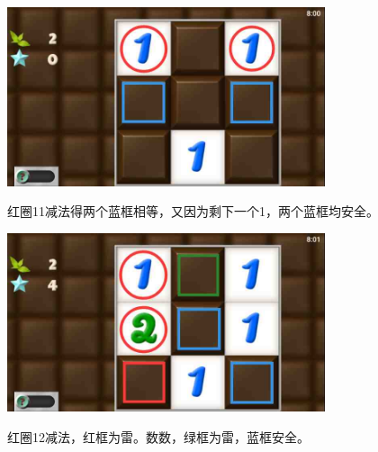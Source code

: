 \subsection{} %
\begin{center}
    \includegraphics[width=0.7\textwidth]{puzzlelow/12-1.jpg}
\end{center}
红圈11减法得两个蓝框相等，又因为剩下一个1，两个蓝框均安全。
\begin{center}
    \includegraphics[width=0.7\textwidth]{puzzlelow/12-2.jpg}
\end{center}
红圈12减法，红框为雷。数数，绿框为雷，蓝框安全。

